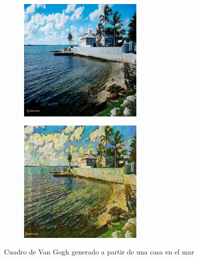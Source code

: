 \documentclass[[../main.tex]{subfiles}
\begin{document}
        \begin{figure}[!htb]
            \begin{subfigure}[b]{0.49\textwidth}
            \includegraphics[width=0.65\textwidth]{imagenes/imagen2cuadro/dataset/vangogh/2014-08-18 17_24_39.jpg}
            \end{subfigure}
        \hfill
            \begin{subfigure}[b]{0.49\textwidth}
            \includegraphics[width=0.65\textwidth]{imagenes/imagen2cuadro/dataset/vangogh/2014-08-18 17_24_39_2.jpg}
            \end{subfigure}
        \caption{Cuadro de Van Gogh generado a partir de una casa en el mar}
        \label{fig:vangogh_cuadro_casa_mar}
        \end{figure}
        
\end{document}
